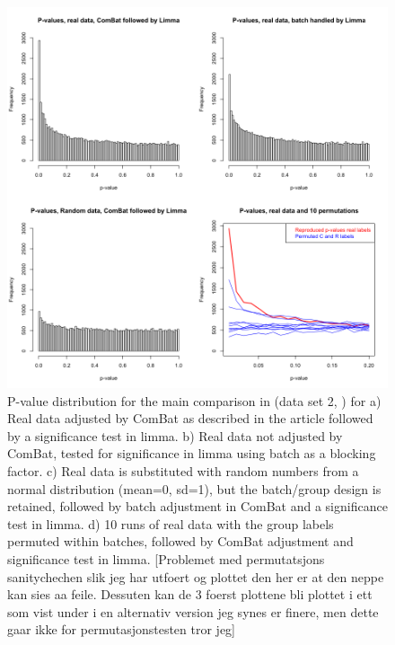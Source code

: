 \documentclass{bio}
\newcommand\NOTE[1]{{\color{red}[#1]}}
\begin{document}
\begin{figure}[!p]
\centering\includegraphics[width=13cm]{Fig/pvaluesjohnson.png}
\caption{
P-value distribution for the main comparison in (data set 2, \citealp{Johnson2007}) for  
a) Real data adjusted by ComBat as described in the article followed by a significance test in limma. 
b) Real data not adjusted by ComBat, tested for significance in limma using batch as a blocking factor. 
c) Real data is substituted with random numbers from a normal distribution (mean=0, sd=1), but the batch/group design is retained, followed by batch adjustment in ComBat and a significance test in limma.
d) 10 runs of real data with the group labels permuted within batches, followed by ComBat adjustment and significance test in limma.   
\NOTE{Problemet med permutatsjons sanitychechen slik jeg har utfoert og plottet den her er at den neppe kan sies aa feile. Dessuten kan de 3 foerst plottene bli plottet i ett som vist under i en alternativ version jeg synes er finere, men dette gaar ikke for permutasjonstesten tror jeg}
}
\label{fig:p-johnson}
\end{figure}
\end{document}
